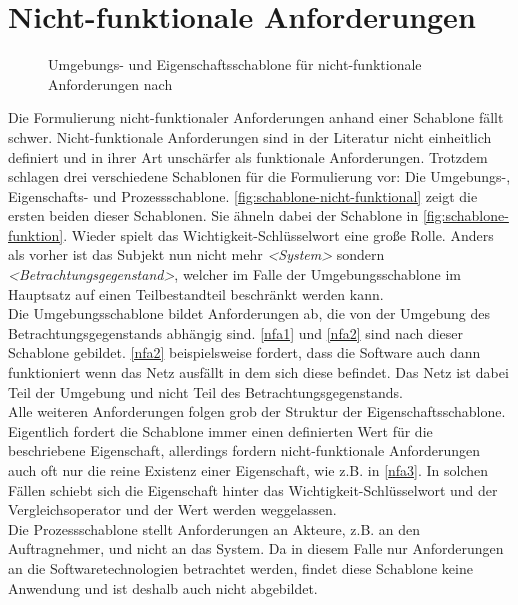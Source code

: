 \section{Nicht-funktionale Anforderungen}
\label{sec:nicht-funktionale}

\begin{figure}
    \centering
    
    
    \caption{Umgebungs- und Eigenschaftsschablone für nicht-funktionale Anforderungen nach }
    \label{fig:schablone-nicht-funktional}
\end{figure}

Die Formulierung nicht-funktionaler Anforderungen anhand einer Schablone fällt schwer. Nicht-funktionale
Anforderungen sind in der Literatur nicht einheitlich definiert und in ihrer Art unschärfer als funktionale
Anforderungen. Trotzdem schlagen  drei verschiedene Schablonen für die Formulierung
vor: Die Umgebungs-, Eigenschafts- und Prozessschablone. \autoref{fig:schablone-nicht-funktional} zeigt
die ersten beiden dieser Schablonen. Sie ähneln dabei der Schablone in \autoref{fig:schablone-funktion}.
Wieder spielt das Wichtigkeit-Schlüsselwort eine große Rolle. Anders als vorher ist das Subjekt nun 
nicht mehr \emph{<System>} sondern \emph{<Betrachtungsgegenstand>}, welcher im Falle der Umgebungsschablone
im Hauptsatz auf einen Teilbestandteil beschränkt werden kann.\\

Die Umgebungsschablone bildet Anforderungen ab, die von der Umgebung 
des Betrachtungsgegenstands abhängig sind. \ref{nfa1} und \ref{nfa2} sind nach dieser Schablone gebildet.
\ref{nfa2} beispielsweise fordert, dass die Software auch dann funktioniert wenn das Netz ausfällt in dem 
sich diese befindet. Das Netz ist dabei Teil der Umgebung und nicht Teil des Betrachtungsgegenstands.\\
Alle weiteren Anforderungen folgen grob der Struktur der Eigenschaftsschablone. Eigentlich fordert die 
Schablone immer einen definierten Wert für die beschriebene Eigenschaft, allerdings fordern nicht-funktionale
Anforderungen auch oft nur die reine Existenz einer Eigenschaft, wie z.B. in \ref{nfa3}.
In solchen Fällen schiebt sich die Eigenschaft hinter das 
Wichtigkeit-Schlüsselwort und der Vergleichsoperator und der Wert werden weggelassen.\\
Die Prozessschablone stellt Anforderungen an Akteure, z.B. an den Auftragnehmer, und nicht an das System.
Da in diesem Falle nur Anforderungen an die Softwaretechnologien betrachtet werden, findet diese Schablone 
keine Anwendung und ist deshalb auch nicht abgebildet.

